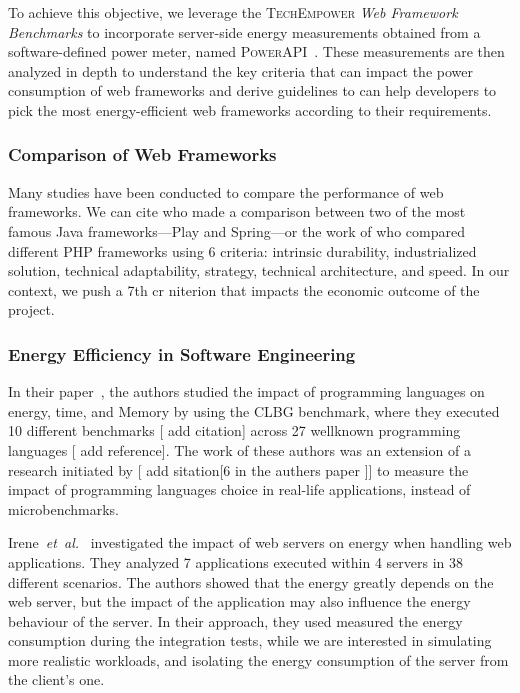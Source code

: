 To achieve this objective, we leverage the \textsc{TechEmpower} \emph{Web Framework Benchmarks} to incorporate server-side energy measurements obtained from a software-defined power meter, named \textsc{PowerAPI}~\cite{}.
These measurements are then analyzed in depth to understand the key criteria that can impact the power consumption of web frameworks and derive guidelines to can help developers to pick the most energy-efficient web frameworks according to their requirements.


\subsubsection{Comparison of Web Frameworks}
Many studies have been conducted to compare the performance of web frameworks.
We can cite \cite{gajewski_analysis_2019} who made a comparison between two of the most famous Java frameworks---Play and Spring---or the work of \cite{benmoussa_new_2019} who compared different PHP frameworks using 6 criteria: intrinsic durability, industrialized solution, technical adaptability, strategy, technical architecture, and speed.
In our context, we push a 7th cr niterion that impacts the economic outcome of the project.

\subsubsection{Energy Efficiency in Software Engineering}
In their paper~\cite{pereira_energy_2017}, the authors studied the impact of programming languages on energy, time, and Memory by using the CLBG benchmark, where they executed 10 different benchmarks [ add citation] across 27 wellknown programming languages [ add reference].
The work of these authors was an extension of a research initiated by [ add sitation[6 in the authers paper ]] to measure the impact of programming languages choice in real-life applications, instead of microbenchmarks.


Irene~\emph{et~al.}~\cite{manotas_investigating_2013} investigated the impact of web servers on energy when handling web applications.
They analyzed 7 applications executed within 4 servers in 38 different scenarios.
The authors showed that the energy greatly depends on the web server, but the impact of the application may also influence the energy behaviour of the server.
In their approach, they used measured the energy consumption during the integration tests, while we are interested in simulating more realistic workloads, and isolating the energy consumption of the server from the client's one.


